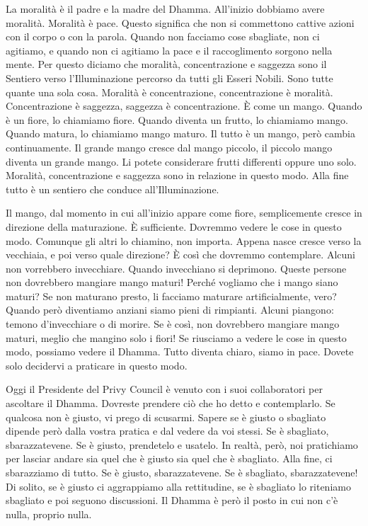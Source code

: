 La moralità è il padre e la madre del Dhamma. All'inizio dobbiamo avere
moralità. Moralità è pace. Questo significa che non si commettono
cattive azioni con il corpo o con la parola. Quando non facciamo cose
sbagliate, non ci agitiamo, e quando non ci agitiamo la pace e il
raccoglimento sorgono nella mente. Per questo diciamo che moralità,
concentrazione e saggezza sono il Sentiero verso l'Illuminazione
percorso da tutti gli Esseri Nobili. Sono tutte quante una sola cosa.
Moralità è concentrazione, concentrazione è moralità. Concentrazione è
saggezza, saggezza è concentrazione. È come un mango. Quando è un fiore,
lo chiamiamo fiore. Quando diventa un frutto, lo chiamiamo mango. Quando
matura, lo chiamiamo mango maturo. Il tutto è un mango, però cambia
continuamente. Il grande mango cresce dal mango piccolo, il piccolo
mango diventa un grande mango. Li potete considerare frutti differenti
oppure uno solo. Moralità, concentrazione e saggezza sono in relazione
in questo modo. Alla fine tutto è un sentiero che conduce
all'Illuminazione.

Il mango, dal momento in cui all'inizio appare come fiore, semplicemente
cresce in direzione della maturazione. È sufficiente. Dovremmo vedere le
cose in questo modo. Comunque gli altri lo chiamino, non importa. Appena
nasce cresce verso la vecchiaia, e poi verso quale direzione? È così che
dovremmo contemplare. Alcuni non vorrebbero invecchiare. Quando
invecchiano si deprimono. Queste persone non dovrebbero mangiare mango
maturi! Perché vogliamo che i mango siano maturi? Se non maturano
presto, li facciamo maturare artificialmente, vero? Quando però
diventiamo anziani siamo pieni di rimpianti. Alcuni piangono: temono
d'invecchiare o di morire. Se è così, non dovrebbero mangiare mango
maturi, meglio che mangino solo i fiori! Se riusciamo a vedere le cose
in questo modo, possiamo vedere il Dhamma. Tutto diventa chiaro, siamo
in pace. Dovete solo decidervi a praticare in questo modo.

Oggi il Presidente del Privy Council è venuto con i suoi collaboratori
per ascoltare il Dhamma. Dovreste prendere ciò che ho detto e
contemplarlo. Se qualcosa non è giusto, vi prego di scusarmi. Sapere se
è giusto o sbagliato dipende però dalla vostra pratica e dal vedere da
voi stessi. Se è sbagliato, sbarazzatevene. Se è giusto, prendetelo e
usatelo. In realtà, però, noi pratichiamo per lasciar andare sia quel
che è giusto sia quel che è sbagliato. Alla fine, ci sbarazziamo di
tutto. Se è giusto, sbarazzatevene. Se è sbagliato, sbarazzatevene! Di
solito, se è giusto ci aggrappiamo alla rettitudine, se è sbagliato lo
riteniamo sbagliato e poi seguono discussioni. Il Dhamma è però il posto
in cui non c'è nulla, proprio nulla.